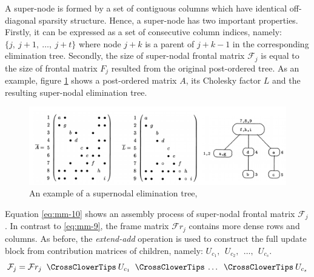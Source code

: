 A super-node is formed by a set of contiguous columns which have identical off-diagonal sparsity structure. Hence, a super-node has two important properties. Firstly, it can be expressed as a set of consecutive column indices, namely: $\{j, \: j+1, \: \dots, \:j + t\}$ where node $j + k$ is a parent of $j + k - 1$ in the corresponding elimination tree. Secondly, the size of super-nodal frontal matrix $\mathcal{F}_{j}$ is equal to the size of frontal matrix $F_{j}$ resulted from the original post-ordered tree. As an example, figure \ref{fig:supernodal-method-postordering-and-etree} shows a post-ordered matrix $A$, its Cholesky factor $L$ and the resulting super-nodal elimination tree.\\


\figpointer{\ref{fig:supernodal-method-postordering-and-etree}}

\begin{figure}[htpb]
  \centering
  \includegraphics[width=1.0\textwidth]{figures/chapter-2/supernodal-method-postordering-and-etree.png}
\caption{An example of a supernodal elimination tree, \cite{mult-frontal-original:2}}
\label{fig:supernodal-method-postordering-and-etree}
\end{figure}
 
 
Equation \ref{eq:mm-10} shows an assembly process of super-nodal frontal matrix $\mathcal{F}_{j}$. In contrast to \ref{eq:mm-9}, the frame matrix $\mathcal{F}r_{j}$ contains more dense rows and columns. As before, the \textit{extend-add} operation is used to construct the full update block from contribution matrices of children, namely: $ U_{c_1}, \:\: U_{c_2}, \:\: \dots, \:\: U_{c_s} $.\\


\begin{equation} \label{eq:mm-10-0}
	\mathcal{F}_{j} = \mathcal{F}r_{j} \extendadd U_{c_1} \extendadd \dots \extendadd U_{c_s} 
\end{equation}


